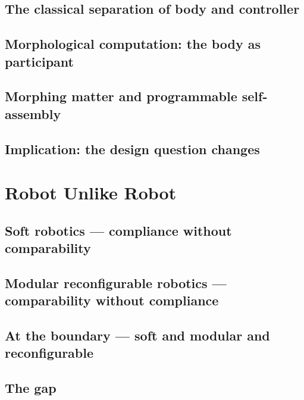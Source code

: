     \subsection{The classical separation of body and controller}

    \subsection{Morphological computation: the body as participant}

    \subsection{Morphing matter and programmable self-assembly}

    \subsection{Implication: the design question changes}

\section{Robot Unlike Robot}

    \subsection{Soft robotics — compliance without comparability}

    \subsection{Modular reconfigurable robotics — comparability without compliance}

    \subsection{At the boundary — soft and modular and reconfigurable}

    \subsection{The gap}
